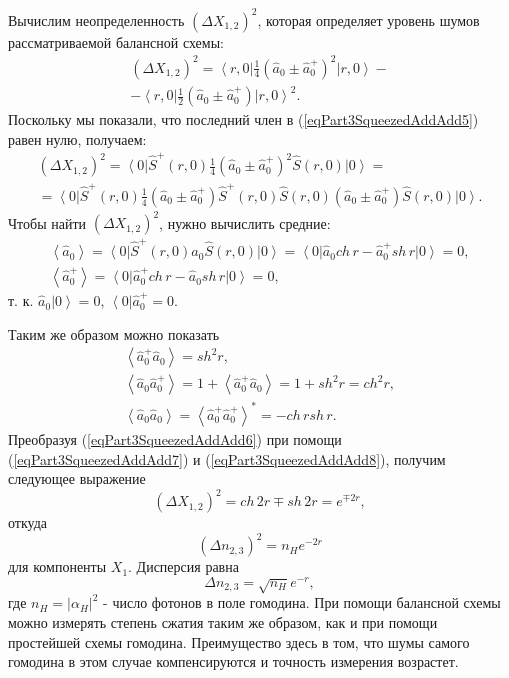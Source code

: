 Вычислим неопределенность $\left(\Delta X_{1,2}\right)^2$, которая
определяет уровень шумов рассматриваемой балансной схемы:
\begin{eqnarray}
\left(\Delta X_{1,2}\right)^2 = 
\left<r,
0\right|\frac{1}{4}\left(\hat{a}_0\pm\hat{a}_0^{+}\right)^2\left|r,
0\right> -
\nonumber \\
-
\left<r,
0\right|\frac{1}{2}\left(\hat{a}_0\pm\hat{a}_0^{+}\right)\left|r,
0\right>^2.
\label{eqPart3SqueezedAddAdd5}
\end{eqnarray}
Поскольку мы показали, что последний член в
(\ref{eqPart3SqueezedAddAdd5}) равен нулю, получаем:
\begin{eqnarray}
\left(\Delta X_{1,2}\right)^2 = 
\left<0\right|\hat{S}^{+}\left(r, 0\right)
\frac{1}{4}\left(\hat{a}_0\pm\hat{a}_0^{+}\right)^2
\hat{S}\left(r, 0\right)
\left|0\right> = 
\nonumber \\
=
\left<0\right|\hat{S}^{+}\left(r, 0\right)
\frac{1}{4}
\left(\hat{a}_0\pm\hat{a}_0^{+}\right)
\hat{S}^{+}\left(r, 0\right)
\hat{S}\left(r, 0\right)
\left(\hat{a}_0\pm\hat{a}_0^{+}\right)
\hat{S}\left(r, 0\right)
\left|0\right>.
\label{eqPart3SqueezedAddAdd6}
\end{eqnarray}
Чтобы найти 
$\left(\Delta X_{1,2}\right)^2$, нужно вычислить средние:
\begin{eqnarray}
\left<\hat{a}_0\right> = 
\left<0\right|
\hat{S}^{+}\left(r, 0\right)
\hat{a}_0
\hat{S}\left(r, 0\right)
\left|0\right> = 
\left<0\right|
\hat{a}_0 ch\,r - \hat{a}_0^{+} sh\,r
\left|0\right> = 0,
\nonumber \\
\left<\hat{a}_0^{+}\right> = 
\left<0\right|
\hat{a}_0^{+} ch\,r - \hat{a}_0 sh\,r
\left|0\right> = 0,
\label{eqPart3SqueezedAddAdd7}
\end{eqnarray}
т. к. $\hat{a}_0\left|0\right> = 0$, 
$\left<0\right|\hat{a}_0^{+} = 0$.

Таким же образом можно показать
\begin{eqnarray}
\left<\hat{a}_0^{+}\hat{a}_0\right> = sh^2 r,
\nonumber \\
\left<\hat{a}_0\hat{a}_0^{+}\right> = 
1 + \left<\hat{a}_0^{+}\hat{a}_0\right> =
1 + sh^2 r = ch^2 r,
\nonumber \\
\left<\hat{a}_0\hat{a}_0\right> = 
\left<\hat{a}_0^{+}\hat{a}_0^{+}\right>^{*} = - ch\,r sh\,r.
\label{eqPart3SqueezedAddAdd8}
\end{eqnarray}
Преобразуя (\ref{eqPart3SqueezedAddAdd6}) при помощи
(\ref{eqPart3SqueezedAddAdd7}) 
и
(\ref{eqPart3SqueezedAddAdd8}),
получим следующее выражение
\begin{equation}
\left(\Delta X_{1,2}\right)^2 = 
ch\,2 r \mp sh\, 2 r = 
e^{\mp 2 r},
\nonumber
\end{equation}
откуда
\begin{equation}
\left(\Delta n_{2,3}\right)^2 = 
n_H
e^{- 2 r}
\nonumber
\end{equation}
для компоненты $X_1$. Дисперсия равна 
\[
\Delta n_{2,3} = 
\sqrt{n_H}
e^{- r},
\]
где $n_H=\left|\alpha_H\right|^2$ - число фотонов в поле гомодина.
При помощи балансной схемы можно измерять степень сжатия таким же
образом, как и при помощи простейшей схемы гомодина. Преимущество
здесь в том, что шумы самого гомодина в этом случае компенсируются и
точность измерения возрастет.


